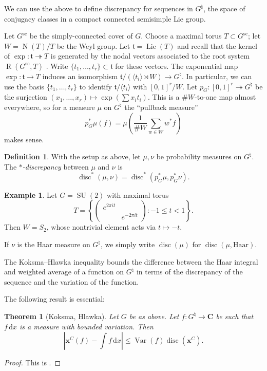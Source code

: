 \documentclass{article}
\DeclareMathOperator{\disc}{disc}
\DeclareMathOperator{\Lie}{Lie}
\DeclareMathOperator{\N}{N}
\DeclareMathOperator{\R}{R}
\DeclareMathOperator{\SU}{SU}
\DeclareMathOperator{\Var}{Var}
\newcommand{\bC}{\mathbf{C}}
\newcommand{\bx}{{\boldsymbol x}}
\newcommand{\ft}{\mathfrak{t}}
\newcommand{\dd}{\mathrm{d}}
\newcommand{\Haar}{\mathrm{Haar}}
\newcommand{\simplc}{\mathrm{sc}}
\newtheorem{theorem}[subsection]{Theorem}
\theoremstyle{definition}
\newtheorem{definition}[subsection]{Definition}
\newtheorem{example}[subsection]{Example}
\begin{document}
We can use the above to define discrepancy for sequences in $G^\natural$, the 
space of conjugacy classes in a compact connected semisimple Lie group.

Let $G^\simplc$ be the simply-connected cover of $G$. Choose a maximal torus 
$T\subset G^\simplc$; let $W=\N(T)/T$ be the Weyl group. Let $\ft=\Lie(T)$ and 
recall that the kernel of $\exp\colon \ft\twoheadrightarrow T$ is generated by 
the nodal vectors associated to the root system $\R(G^\simplc,T)$ 
\cite[9.6 Pr.11]{bourbaki-lie-alg-7-9}. Write $\{t_1,\dots,t_r\}\subset \ft$ 
for these vectors. The exponential map $\exp\colon \ft\to T$ induces an 
isomorphism $\ft/(\langle t_i\rangle \rtimes W) \to G^\natural$. In particular, 
we can use the basis $\{t_1,\dots,t_r\}$ to identify $\ft/\langle t_i\rangle$ 
with $[0,1]^r/W$. Let $p_G\colon [0,1]^r \twoheadrightarrow G^\natural$ be the 
surjection $(x_1,\dots,x_r)\mapsto \exp(\sum x_i t_i)$. This is a $\# W$-to-one 
map almost everywhere, so for a measure $\mu$ on $G^\natural$ the ``pullback 
measure'' 
\[
	p_G^\ast \mu(f) = \mu\left(\frac{1}{\# W} \sum_{w\in W} w^\ast f\right)
\]
makes sense. 

\begin{definition}
With the setup as above, let $\mu,\nu$ be probability measures on $G^\natural$. 
The \emph{$\ast$-discrepancy} between $\mu$ and $\nu$ is
\[
	\disc^\ast(\mu,\nu) = \disc^\ast(p_G^\ast \mu,p_G^\ast \nu).
\]
\end{definition}

\begin{example}
Let $G=\SU(2)$ with maximal torus 
\[
	T = \left\{ \begin{pmatrix} e^{2\pi i t} \\ & e^{-2\pi i t} \end{pmatrix} : -1\leqslant t <1\right\} .
\]
Then $W=S_2$, whose nontrivial element acts via $t\mapsto -t$. 
\end{example}

If $\nu$ is the Haar measure on $G^\natural$, we simply write 
$\disc(\mu)$ for $\disc(\mu,\Haar)$. 

The Koksma--Hlawka inequality bounds the difference between the Haar integral 
and weighted average of a function on $G^\natural$ in terms of the discrepancy 
of the sequence and the variation of the function. 

The following result is essential:

\begin{theorem}[Koksma, Hlawka]
Let $G$ be as above. Let $f\colon G^\natural\to \bC$ be such that $f\, \dd x$ 
is a measure with bounded variation. Then 
\[
	\left|\bx^C(f) - \int f\, \dd x\right| \leqslant \Var(f) \disc(\bx^C) .
\]
\end{theorem}
\begin{proof}
This is \cite[Th.~3.2]{okten-1999}. 
\end{proof}
\end{document}
